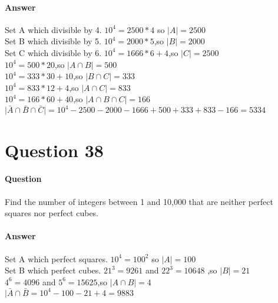 \documentclass{article}
\begin{document}
\paragraph{Answer}
Set A which divisible by 4. $10^{4} = 2500 * 4 $ so $\vert A \vert = 2500$ \\
Set B which divisible by 5. $10^{4} = 2000 * 5 $,so $\vert B \vert = 2000$ \\
Set C which divisible by 6. $10^{4} = 1666 * 6 + 4$,so $\vert C \vert = 2500$ \\
$10^{4} = 500 * 20$,so $\vert A \cap B \vert = 500$ \\
$10^{4} = 333 * 30 + 10$,so $\vert B \cap C \vert = 333$ \\
$10^{4} = 833 * 12 + 4$,so $\vert A \cap C \vert = 833$ \\
$10^{4} = 166 * 60 + 40$,so $\vert A \cap B \cap C \vert = 166$ \\
$\vert \bar{A} \cap \bar{B} \cap \bar{C}\vert = 10^{4} - 2500 - 2000 - 1666 + 500 + 333 + 833 - 166 = 5334$
\section{Question 38}
\paragraph{Question}
Find the number of integers between 1 and 10,000 that are neither perfect squares nor perfect cubes.
\paragraph{Answer}
Set A which perfect squares. $10^{4} = 100^{2} $ so $\vert A \vert = 100$ \\
Set B which perfect cubes. $21^{3} = 9261$ and $22^{3} = 10648$ ,so $\vert B \vert = 21$ \\
$4^{6} = 4096$ and $5^{6} = 15625$,so $\vert A \cap B \vert = 4$ \\
$\vert \bar{A} \cap \bar{B} = 10^{4} - 100 -21 +4 = 9883$
\end{document}
